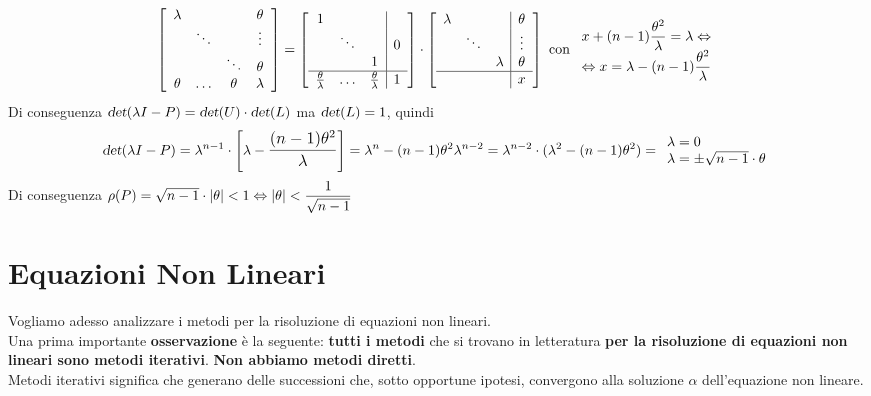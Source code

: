 \documentclass[10pt]{book}
\begin{document}
$$\left[ \begin{array}{c c c c}
\lambda & & & \theta\\
& \ddots & & \vdots\\
& & \ddots & \theta\\
\theta & \ldots & \theta & \lambda
\end{array}\right] = \left[ \begin{array}{c c c | c}
1 & & & \\
& \ddots & & 0\\
& & 1 & \\
\hline
\frac{\theta}{\lambda} & \ldots & \frac{\theta}{\lambda} & 1
\end{array}\right]\cdot \left[ \begin{array}{c c c | c}
\lambda & & & \theta \\
& \ddots & & \vdots\\
& & \lambda & \theta \\
\hline
& & & x
\end{array}\right]\text{ con }\begin{array}{l}
x + (n-1)\mathlarger{\frac{\theta^2}{\lambda}} = \lambda \Leftrightarrow\\
\Leftrightarrow x = \lambda - (n-1)\mathlarger{\frac{\theta^2}{\lambda}}
\end{array}$$
Di conseguenza $\textsl{det}(\lambda I - P) = \textsl{det}(U) \cdot \textsl{det}(L)$ ma $\textsl{det}(L) = 1$, quindi
$$\textsl{det}(\lambda I - P) = \lambda^{n-1}\cdot\left[\lambda - \mathlarger{\frac{(n-1)\theta^2}{\lambda}}\right] = \lambda^n - (n-1)\theta^2\lambda^{n-2} = \lambda^{n-2}\cdot(\lambda^2 - (n-1)\theta^2) = \begin{array}{l}
\lambda = 0\\
\lambda = \pm\sqrt{n-1}\cdot\theta
\end{array}$$
Di conseguenza $\rho(P) = \sqrt{n-1}\cdot|\theta| < 1 \Leftrightarrow |\theta| < \mathlarger{\frac{1}{\sqrt{n-1}}}$
\chapter{Equazioni Non Lineari}
Vogliamo adesso analizzare i metodi per la risoluzione di equazioni non lineari.\\
Una prima importante \textbf{osservazione} è la seguente: \textbf{tutti i metodi} che si trovano in letteratura \textbf{per la risoluzione di equazioni non lineari sono metodi iterativi}. \textbf{Non abbiamo metodi diretti}.\\
Metodi iterativi significa che generano delle successioni che, sotto opportune ipotesi, convergono alla soluzione $\alpha$ dell'equazione non lineare.
\end{document}
